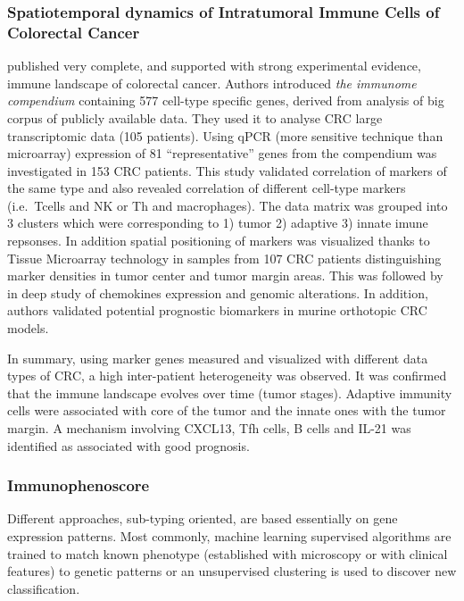 \documentclass[12pt,]{book}
\theoremstyle{definition}
\theoremstyle{definition}
\theoremstyle{definition}
\theoremstyle{remark}
\begin{document}
\hypertarget{spatiotemporal-dynamics-of-intratumoral-immune-cells-of-colorectal-cancer}{%
\subsubsection{Spatiotemporal dynamics of Intratumoral Immune Cells of
Colorectal
Cancer}\label{spatiotemporal-dynamics-of-intratumoral-immune-cells-of-colorectal-cancer}}

\citet{Bindea2013} published very complete, and supported with strong
experimental evidence, immune landscape of colorectal cancer. Authors
introduced \emph{the immunome compendium} containing 577 cell-type
specific genes, derived from analysis of big corpus of publicly
available data. They used it to analyse CRC large transcriptomic data
(105 patients). Using qPCR (more sensitive technique than microarray)
expression of 81 ``representative'' genes from the compendium was
investigated in 153 CRC patients. This study validated correlation of
markers of the same type and also revealed correlation of different
cell-type markers (i.e.~Tcells and NK or Th and macrophages). The data
matrix was grouped into 3 clusters which were corresponding to 1) tumor
2) adaptive 3) innate imune repsonses. In addition spatial positioning
of markers was visualized thanks to Tissue Microarray technology in
samples from 107 CRC patients distinguishing marker densities in tumor
center and tumor margin areas. This was followed by in deep study of
chemokines expression and genomic alterations. In addition, authors
validated potential prognostic biomarkers in murine orthotopic CRC
models.

In summary, using marker genes measured and visualized with different
data types of CRC, a high inter-patient heterogeneity was observed. It
was confirmed that the immune landscape evolves over time (tumor
stages). Adaptive immunity cells were associated with core of the tumor
and the innate ones with the tumor margin. A mechanism involving CXCL13,
Tfh cells, B cells and IL-21 was identified as associated with good
prognosis.

\hypertarget{immunophenoscore}{%
\subsubsection{Immunophenoscore}\label{immunophenoscore}}

Different approaches, sub-typing oriented, are based essentially on gene
expression patterns. Most commonly, machine learning supervised
algorithms are trained to match known phenotype (established with
microscopy or with clinical features) to genetic patterns or an
unsupervised clustering is used to discover new classification.
\end{document}
